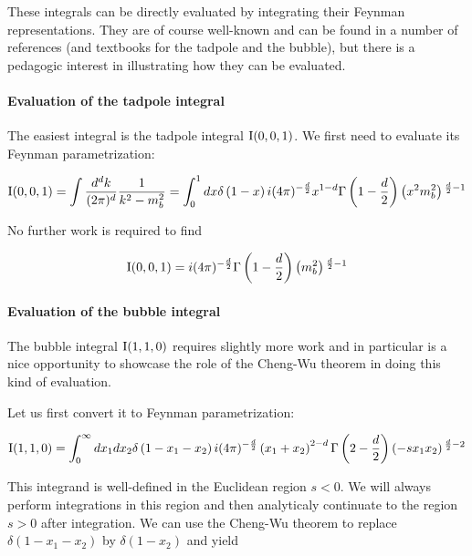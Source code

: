 These integrals can be directly evaluated by integrating their Feynman representations. They are of course well-known and can be found in a number of references (and textbooks for the tadpole and the bubble), but there is a pedagogic interest in illustrating how they can be evaluated.

\paragraph{Evaluation of the tadpole integral}

The easiest integral is the tadpole integral $\text{I}(0,0,1)$. We first need to evaluate its Feynman parametrization:

\begin{equation}
\text{I}(0,0,1)= \int\frac{d^dk}{(2\pi)^d} \frac{1}{k^2-m_b^2} = \int_0^1 dx \delta\left(1-x\right) i (4 \pi )^{-\frac{d}{2}} x^{1-d} \Gamma \left(1-\frac{d}{2}\right) \left(x^2 m_b^2\right){}^{\frac{d}{2}-1}
\end{equation}

No further work is required to find

\begin{equation}
  \text{I}(0,0,1)=i (4 \pi )^{-\frac{d}{2}} \Gamma \left(1-\frac{d}{2}\right) \left(m_b^2\right){}^{\frac{d}{2}-1}
\end{equation}

\paragraph{Evaluation of the bubble integral}

The bubble integral $\text{I}(1,1,0)$ requires slightly more work and in particular is a nice opportunity to showcase the role of the Cheng-Wu theorem in doing this kind of evaluation.

Let us first convert it to Feynman parametrization:

\begin{equation}
  \text{I}(1,1,0) = \int_0^\infty dx_1dx_2 \delta\left(1-x_1-x_2\right) i (4 \pi )^{-\frac{d}{2}} \left(x_1+x_2\right)^{2-d} \Gamma \left(2-\frac{d}{2}\right) \left(-s x_1 x_2\right){}^{\frac{d}{2}-2}
\end{equation}

This integrand is well-defined in the Euclidean region $s<0$. We will always perform integrations in this region and then analyticaly continuate to the region $s>0$ after integration. We can use the Cheng-Wu theorem to replace $\delta\left(1-x_1-x_2\right)$ by $\delta\left(1-x_2\right)$ and yield

